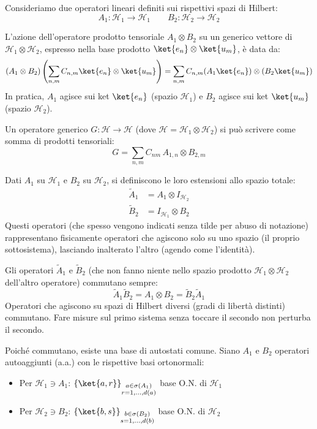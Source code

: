 Consideriamo due operatori lineari definiti sui rispettivi spazi di Hilbert:
\[
    A_1: \mathcal{H}_1 \to \mathcal{H}_1 \qquad B_2: \mathcal{H}_2 \to \mathcal{H}_2
\]

L'azione dell'operatore prodotto tensoriale \(A_1 \otimes B_2\) su un generico vettore di \(\mathcal{H}_1 \otimes \mathcal{H}_2\), espresso nella base prodotto \(\ket{e_n} \otimes \ket{u_m}\), è data da:
\begin{equation}
    (A_1 \otimes B_2) \left( \sum_{n,m} C_{n,m} \ket{e_n} \otimes \ket{u_m} \right) = \sum_{n,m} C_{n,m} (A_1\ket{e_n}) \otimes (B_2\ket{u_m})
\end{equation}
In pratica, \(A_1\) agisce sui ket \(\ket{e_n}\) (spazio \(\mathcal{H}_1\)) e \(B_2\) agisce sui ket \(\ket{u_m}\) (spazio \(\mathcal{H}_2\)).

Un operatore generico \(G: \mathcal{H} \to \mathcal{H}\) (dove \(\mathcal{H} = \mathcal{H}_1 \otimes \mathcal{H}_2\)) si può scrivere come somma di prodotti tensoriali:
\begin{equation}
    G = \sum_{n,m} C_{nm} \, A_{1,n} \otimes B_{2,m}
\end{equation}

Dati \(A_1\) su \(\mathcal{H}_1\) e \(B_2\) su \(\mathcal{H}_2\), si definiscono le loro estensioni allo spazio totale:
\begin{align}
    \tilde{A}_1 &= A_1 \otimes I_{\mathcal{H}_2} \\
    \tilde{B}_2 &= I_{\mathcal{H}_1} \otimes B_2
\end{align}
Questi operatori (che spesso vengono indicati senza tilde per abuso di notazione) rappresentano fisicamente operatori che agiscono solo su uno spazio (il proprio sottosistema), lasciando inalterato l'altro (agendo come l'identità).

\begin{remark}
    Gli operatori \(\tilde{A}_1\) e \(\tilde{B}_2\) (che non fanno niente nello spazio prodotto \(\mathcal{H}_1 \otimes \mathcal{H}_2\) dell'altro operatore) commutano sempre:
    \begin{equation}
        \tilde{A}_1 \tilde{B}_2 = A_1 \otimes B_2 = \tilde{B}_2 \tilde{A}_1
    \end{equation}
    Operatori che agiscono su spazi di Hilbert diversi (gradi di libertà distinti) commutano. Fare misure sul primo sistema senza toccare il secondo non perturba il secondo.
\end{remark}

Poiché commutano, esiste una base di autostati comune.
Siano \(A_1\) e \(B_2\) operatori autoaggiunti (a.a.) con le rispettive basi ortonormali:
\begin{itemize}
    \item Per \(\mathcal{H}_1 \ni A_1\): \(\left\{ \ket{a, r} \right\}_{\substack{a \in \sigma(A_1) \\ r=1,\dots,d(a)}}\) base O.N. di \(\mathcal{H}_1\)
    \item Per \(\mathcal{H}_2 \ni B_2\): \(\left\{ \ket{b, s} \right\}_{\substack{b \in \sigma(B_2) \\ s=1,\dots,d(b)}}\) base O.N. di \(\mathcal{H}_2\)
\end{itemize}

